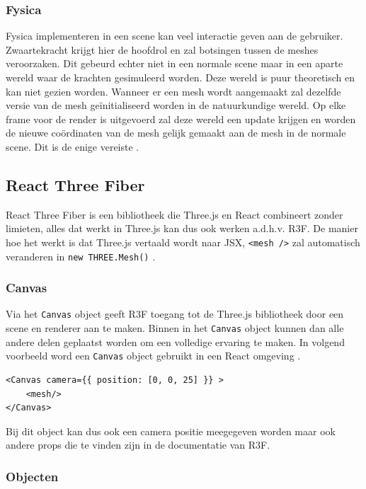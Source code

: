 \subsubsection{Fysica}

Fysica implementeren in een scene kan veel interactie geven aan de gebruiker. Zwaartekracht krijgt hier de hoofdrol en zal botsingen tussen de meshes veroorzaken. Dit gebeurd echter niet in een normale scene maar in een aparte wereld waar de krachten gesimuleerd worden. Deze wereld is puur theoretisch en kan niet gezien worden. Wanneer er een mesh wordt aangemaakt zal dezelfde versie van de mesh geïnitialiseerd worden in de natuurkundige wereld.
Op elke frame voor de render is uitgevoerd zal deze wereld een update krijgen en worden de nieuwe coördinaten van de mesh gelijk gemaakt aan de mesh in de normale scene. Dit is de enige vereiste \autocite{Simon2023}.
\newpage
\subsection{React Three Fiber}

React Three Fiber is een bibliotheek die Three.js en React combineert zonder limieten, alles dat werkt in Three.js kan dus ook werken a.d.h.v. R3F. De manier hoe het werkt is dat Three.js vertaald wordt naar JSX, \texttt{<mesh />} zal automatisch veranderen in \texttt{new THREE.Mesh()} \autocite{reactThreeFiber2023}.

\subsubsection{Canvas}

Via het \texttt{Canvas} object geeft R3F toegang tot de Three.js bibliotheek door een scene en renderer aan te maken. Binnen in het  \texttt{Canvas} object kunnen dan alle andere delen geplaatst worden om een volledige ervaring te maken. In volgend voorbeeld word een  \texttt{Canvas} object gebruikt in een React omgeving \autocite{reactThreeFiber2023}.

\begin{lstlisting}
<Canvas camera={{ position: [0, 0, 25] }} >
	<mesh/>
</Canvas>
\end{lstlisting}

Bij dit object kan dus ook een camera positie meegegeven worden maar ook andere props die te vinden zijn in de documentatie van R3F.
\newpage
\subsubsection{Objecten}

